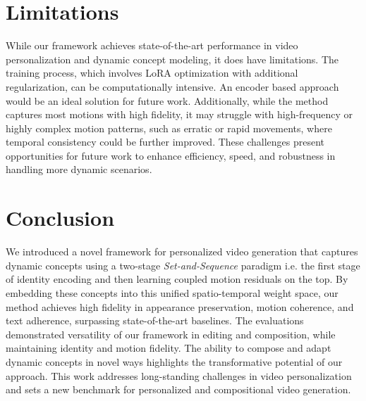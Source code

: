 
\section{Limitations}

While our framework achieves state-of-the-art performance in video personalization and dynamic concept modeling, it does have limitations. The training process, which involves LoRA optimization with additional regularization, can be computationally intensive. An encoder based approach would be an ideal solution for future work. Additionally, while the method captures most motions with high fidelity, it may struggle with high-frequency or highly complex motion patterns, such as erratic or rapid movements, where temporal consistency could be further improved. These challenges present opportunities for future work to enhance efficiency, speed, and robustness in handling more dynamic scenarios.


\section{Conclusion}

We introduced a novel framework for personalized video generation that captures dynamic concepts using a two-stage \textit{Set-and-Sequence} paradigm i.e. the first stage of identity encoding and then learning coupled motion residuals on the top. By embedding these concepts into this unified spatio-temporal weight space, our method achieves high fidelity in appearance preservation, motion coherence, and text adherence, surpassing state-of-the-art baselines. The evaluations demonstrated versatility of our framework in editing and composition, while maintaining identity and motion fidelity. The ability to compose and adapt dynamic concepts in novel ways highlights the transformative potential of our approach. This work addresses long-standing challenges in video personalization and sets a new benchmark for personalized and compositional video generation.